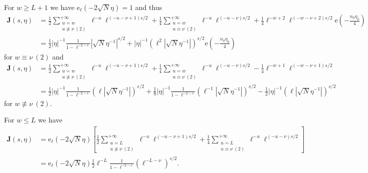 \documentclass[10pt,oneside,reqno]{amsart}
\makeatletter
\newcommand\rme{\mathrm{e}}
\newcommand\bJ{\mathbf{J}}
\renewcommand\leq{\leqslant}
\renewcommand\geq{\geqslant}
\theoremstyle{THEOREM}
\theoremstyle{DEFINITION}
\theoremstyle{EXERCISE}
\numberwithin{equation}{section}
\renewenvironment{proof}[1][\proofname]{\par
  \vspace{-6pt}
  \pushQED{\qed}
  \normalfont \topsep6\p@\@plus6\p@\relax
  \trivlist
  \item[\hskip\labelsep\rmfamily\bfseries
    #1\@addpunct{:}]\ignorespaces
}{
  \popQED\endtrivlist\@endpefalse
  \vspace{-6pt}
}
\makeatother
\begin{document}
\begin{proof}
For $w\geq L+1$ we have $\rme_\ell(-2\sqrt{N}\eta)=1$ and thus
\begin{align*}
\bJ(s,\eta)&=\frac{1}{2}\sum_{\substack{u=w\\u\not\equiv \nu \ (2)}}^{+\infty}\ell^{-u}\ell^{(-u-\nu+1)s/2}+\frac{1}{4}\sum_{\substack{u=w\\u\equiv \nu \ (2)}}^{+\infty}\ell^{-u}\ell^{(-u-\nu)s/2}+\frac14 \ell^{-w+2}\ell^{(-w-\nu+2)s/2}\rme\left(-\frac{n_0\eta_0}{4}\right)\\
&=\frac{1}{2}|\eta|^{-1}\frac{1}{1-\ell^{-2-s}}|\sqrt{N}\eta^{-1}|^{s/2}+|\eta|^{-1} (\ell^2|\sqrt{N}\eta^{-1}|)^{s/2}\rme\left(-\frac{n_0\eta_0}{4}\right)
\end{align*}
for $w\equiv \nu\ (2)$ and
\begin{align*}
\bJ(s,\eta)&=\frac{1}{2}\sum_{\substack{u=w\\u\not\equiv \nu \ (2)}}^{+\infty}\ell^{-u}\ell^{(-u-\nu+1)s/2}+\frac{1}{4}\sum_{\substack{u=w\\u\equiv \nu \ (2)}}^{+\infty}\ell^{-u}\ell^{(-u-\nu)s/2}-\frac14 \ell^{-w+1}\ell^{(-w-\nu+1)s/2}\\
&=\frac{1}{2}|\eta|^{-1}\frac{1}{1-\ell^{-2-s}}(\ell|\sqrt{N}\eta^{-1}|)^{s/2}+ \frac{1}{8}|\eta|^{-1}\frac{1}{1-\ell^{-2-s}}(\ell^{-1}|\sqrt{N}\eta^{-1}|)^{s/2}-\frac12 |\eta|^{-1}(\ell|\sqrt{N}\eta^{-1}|)^{s/2}
\end{align*}
for $w\not\equiv \nu\ (2)$. 

For $w\leq L$ we have
\begin{align*}
\bJ(s,\eta)&=\rme_\ell(-2\sqrt{N}\eta)\left[\frac{1}{2}\sum_{\substack{u=L\\u\not\equiv \nu \ (2)}}^{+\infty}\ell^{-u}\ell^{(-u-\nu+1)s/2}+\frac{1}{4}\sum_{\substack{u=L\\u\equiv \nu \ (2)}}^{+\infty}\ell^{-u}\ell^{(-u-\nu)s/2}\right]\\
&=\rme_\ell(-2\sqrt{N}\eta)\frac{1}{2}\ell^{-L}\frac{1}{1-\ell^{-2-s}}(\ell^{-L-\nu})^{s/2}.
\end{align*}


\end{proof}
\end{document}
